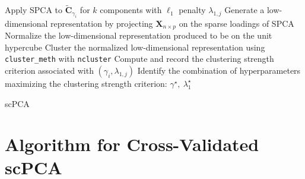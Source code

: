 \documentclass{article}
\begin{document}
\begin{algorithm}[!htbp]
{{      Apply SPCA to $\widetilde{\mathbf{C}}_{\gamma_i}$ for $k$ components with $\ell_1$ penalty $\lambda_{1, j}$\;
      Generate a low-dimensional representation by projecting $\mathbf{X}_{n \times p}$ on the sparse loadings of SPCA\;
      Normalize the low-dimensional representation produced to be on the unit hypercube\;
      Cluster the normalized low-dimensional representation using \texttt{cluster\_meth} with \texttt{ncluster}\;
      Compute and record the clustering strength criterion associated with
      $(\gamma_i, \lambda_{1, j})$ \;
    }
  }
  Identify the combination of hyperparameters maximizing the clustering strength
  criterion: $\gamma^{\star},\: \lambda_1^{\star}$ \;
  \caption{scPCA}
\end{algorithm}


\newpage
\section{Algorithm for Cross-Validated scPCA}
\end{document}

